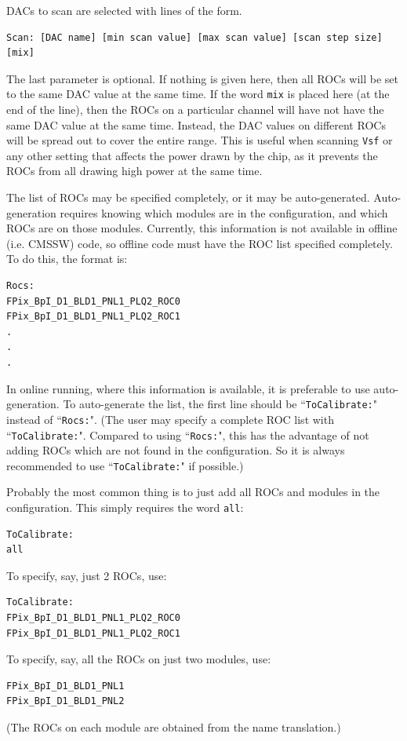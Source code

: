DACs to scan are selected with lines of the form.
\begin{verbatim}
Scan: [DAC name] [min scan value] [max scan value] [scan step size] [mix]
\end{verbatim}
The last parameter is optional.  If nothing is given here, then all ROCs will be set to the same DAC value at the same time.  If the word \verb|mix| is placed here (at the end of the line), then the ROCs on a particular channel will have not have the same DAC value at the same time.  Instead, the DAC values on different ROCs will be spread out to cover the entire range.  This is useful when scanning \verb|Vsf| or any other setting that affects the power drawn by the chip, as it prevents the ROCs from all drawing high power at the same time.

The list of ROCs may be specified completely, or it may be auto-generated.  
Auto-generation requires knowing which modules are in the configuration, and 
which ROCs are on those modules.  Currently, this information is not 
available in offline (i.e. CMSSW) code, so offline code must have the 
ROC list specified completely.  To do this, the format is:
\begin{verbatim}
Rocs:
FPix_BpI_D1_BLD1_PNL1_PLQ2_ROC0
FPix_BpI_D1_BLD1_PNL1_PLQ2_ROC1
.
.
.
\end{verbatim}
In online running, where this information is available, it is preferable 
to use auto-generation.  To auto-generate the list, the first line should 
be ``\verb|ToCalibrate:|" instead of ``\verb|Rocs:|".  (The user may 
specify a complete ROC list with ``\verb|ToCalibrate:|".  Compared to 
using ``\verb|Rocs:|", this has the advantage of not adding ROCs which 
are not found in the configuration.  So it is always recommended to 
use ``\verb|ToCalibrate:|" if possible.)

Probably the most common thing is to just add all ROCs and modules in 
the configuration. This simply requires the word \verb|all|:
\begin{verbatim}
ToCalibrate:
all
\end{verbatim}

To specify, say, just 2 ROCs, use:
\begin{verbatim}
ToCalibrate:
FPix_BpI_D1_BLD1_PNL1_PLQ2_ROC0
FPix_BpI_D1_BLD1_PNL1_PLQ2_ROC1
\end{verbatim}

To specify, say, all the ROCs on just two modules, use:
\begin{verbatim}
FPix_BpI_D1_BLD1_PNL1
FPix_BpI_D1_BLD1_PNL2
\end{verbatim}
(The ROCs on each module are obtained from the name translation.)

